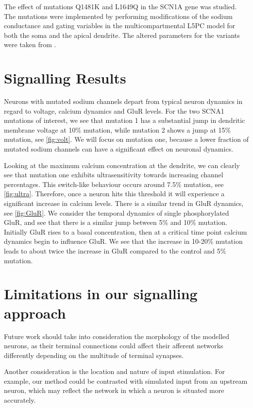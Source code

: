 The effect of mutations Q1481K and L1649Q in the SCN1A gene was studied. The mutations were
implemented by performing modifications of the sodium conductance and gating variables in the
multicompartmental L5PC model for both the soma and the apical dendrite. The altered parameters for
the variants were taken from \cite{maki2016functional}.

\section{Signalling Results}
Neurons with mutated sodium channels depart from typical neuron dynamics in regard to voltage,
calcium dynamics and GluR levels. For the two SCNA1 mutations of interest, we see that
mutation 1 has a substantial jump in dendritic membrane voltage at 10\% mutation, while mutation 2
shows a jump at 15\% mutation, see \cref{fig:volt}. We will focus on mutation one, because a lower
fraction of mutated sodium channels can have a significant effect on neuronal dynamics.

Looking at the maximum calcium concentration at the dendrite, we can clearly see that mutation one
exhibits ultrasensitivity towards increasing channel percentages. This switch-like behaviour occurs
around 7.5\% mutation, see \cref{fig:ultra}. Therefore, once a neuron hits this threshold it will
experience a significant increase in calcium levels. There is a similar trend in GluR dynamics, see
\cref{fig:GluR}. We consider the temporal dynamics of single phosphorylated GluR, and see that there
is a similar jump between 5\% and 10\% mutation.  Initially GluR rises to a basal concentration,
then at a critical time point calcium dynamics begin to influence GluR. We see that the increase in
10-20\% mutation leads to about twice the increase in GluR compared to the control and 5\% mutation. 

\section{Limitations in our signalling approach}

Future work should take into consideration the morphology of the modelled neurons, as their terminal
connections could affect their afferent networks differently depending on the multitude of terminal
synapses.


Another consideration is the location and nature of input stimulation. For example, our method could
be contrasted with simulated input from an upstream neuron, which may reflect the network in which a
neuron is situated more accurately.

